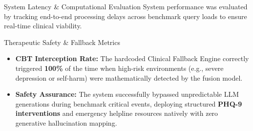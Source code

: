 \documentclass[11pt]{beamer}
\begin{document}
\begin{frame}{System Latency \& Computational Evaluation}
    \justifying
    System performance was evaluated by tracking end-to-end processing delays across benchmark query loads to ensure real-time clinical viability.
    
    \vspace{0.3cm}
    \begin{table}[]
    \centering
    \caption{End-to-End Component Latency Metrics}
    \end{table}
\end{frame}

\begin{frame}{Therapeutic Safety \& Fallback Metrics}
    \justifying
    \begin{itemize}
        \item \textbf{CBT Interception Rate:} The hardcoded Clinical Fallback Engine correctly triggered \textbf{100\%} of the time when high-risk environments (e.g., severe depression or self-harm) were mathematically detected by the fusion model.
        \item \textbf{Safety Assurance:} The system successfully bypassed unpredictable LLM generations during benchmark critical events, deploying structured \textbf{PHQ-9 interventions} and emergency helpline resources natively with zero generative hallucination mapping.
    \end{itemize}
\end{frame}
\end{document}

